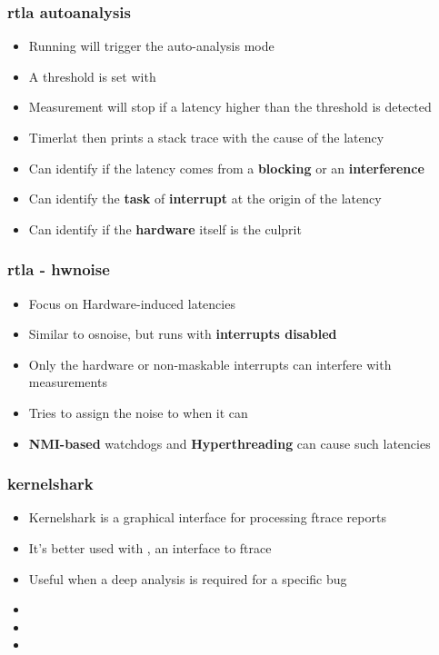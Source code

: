 \begin{frame}
	\frametitle{rtla autoanalysis}
	\begin{itemize}
		\item Running  will trigger the auto-analysis mode
		\item A threshold is set with 
		\item Measurement will stop if a latency higher than the threshold is detected
		\item Timerlat then prints a stack trace with the cause of the latency
		\item Can identify if the latency comes from a \textbf{blocking} or an \textbf{interference}
		\item Can identify the \textbf{task} of \textbf{interrupt} at the origin of the latency
		\item Can identify if the \textbf{hardware} itself is the culprit
	\end{itemize}
\end{frame}

\begin{frame}
	\frametitle{rtla - hwnoise}
	\begin{itemize}
		\item Focus on Hardware-induced latencies
		\item Similar to osnoise, but runs with \textbf{interrupts disabled}
		\item Only the hardware or non-maskable interrupts can interfere with measurements
		\item Tries to assign the noise to  when it can
		\item \textbf{NMI-based} watchdogs and \textbf{Hyperthreading} can cause such latencies
	\end{itemize}
\end{frame}

\begin{frame}
	\frametitle{kernelshark}
	\begin{itemize}
		\item Kernelshark is a graphical interface for processing ftrace reports
		\item It's better used with , an interface to ftrace
		\item Useful when a deep analysis is required for a specific bug 
		\item {}
		\item {}
		\item {}
	\end{itemize}
\end{frame}

